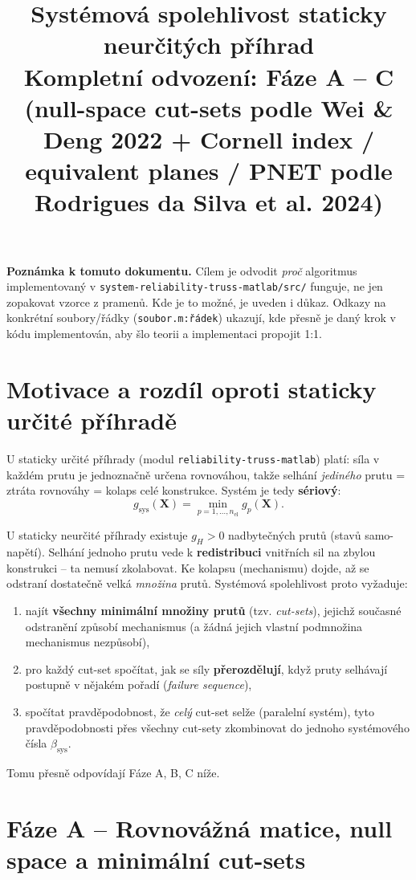 \documentclass[11pt,a4paper]{article}
\title{Systémová spolehlivost staticky neurčitých příhrad\\
\large Kompletní odvození: Fáze A -- C\\
\normalsize (null-space cut-sets podle Wei \& Deng 2022 + Cornell index / equivalent planes / PNET podle Rodrigues da Silva et al. 2024)}
\author{}
\date{}
\newcommand{\code}[1]{\texttt{#1}}
\begin{document}
\maketitle
\tableofcontents

\bigskip
\noindent\textbf{Poznámka k tomuto dokumentu.} Cílem je odvodit \emph{proč} algoritmus implementovaný
v \code{system-reliability-truss-matlab/src/} funguje, ne jen zopakovat vzorce z pramenů. Kde je to
možné, je uveden i důkaz. Odkazy na konkrétní soubory/řádky (\code{soubor.m:řádek}) ukazují, kde přesně
je daný krok v kódu implementován, aby šlo teorii a implementaci propojit 1:1.

\section{Motivace a rozdíl oproti staticky určité příhradě}

U staticky určité příhrady (modul \code{reliability-truss-matlab}) platí: síla v každém prutu je
jednoznačně určena rovnováhou, takže selhání \emph{jediného} prutu = ztráta rovnováhy = kolaps celé
konstrukce. Systém je tedy \textbf{sériový}:
\[
  g_{\mathrm{sys}}(\mathbf X) = \min_{p=1,\dots,n_{\mathrm{el}}} g_p(\mathbf X).
\]

U staticky neurčité příhrady existuje $g_H>0$ nadbytečných prutů (stavů samo-napětí). Selhání jednoho
prutu vede k \textbf{redistribuci} vnitřních sil na zbylou konstrukci -- ta nemusí zkolabovat. Ke kolapsu
(mechanismu) dojde, až se odstraní dostatečně velká \emph{množina} prutů. Systémová spolehlivost proto
vyžaduje:

\begin{enumerate}[label=(\Alph*)]
  \item najít \textbf{všechny minimální množiny prutů} (tzv. \emph{cut-sets}), jejichž současné odstranění
        způsobí mechanismus (a žádná jejich vlastní podmnožina mechanismus nezpůsobí),
  \item pro každý cut-set spočítat, jak se síly \textbf{přerozdělují}, když pruty selhávají postupně
        v nějakém pořadí (\emph{failure sequence}),
  \item spočítat pravděpodobnost, že \emph{celý} cut-set selže (paralelní systém), tyto pravděpodobnosti
        přes všechny cut-sety zkombinovat do jednoho systémového čísla $\beta_{\mathrm{sys}}$.
\end{enumerate}

Tomu přesně odpovídají Fáze A, B, C níže.

\section{Fáze A -- Rovnovážná matice, null space a minimální cut-sets}
\label{sec:faze-a}
\end{document}
